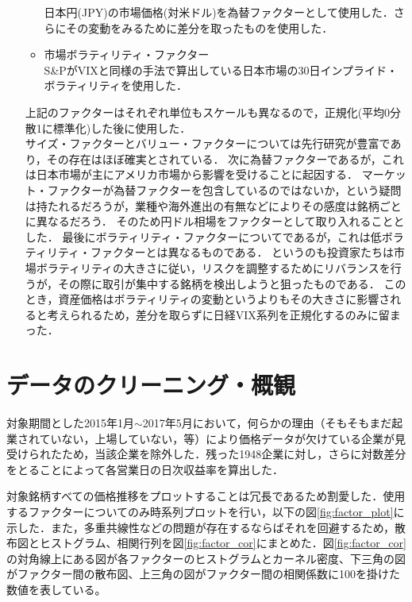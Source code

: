 \documentclass[11pt]{jreport}
\begin{document}
\begin{itemize}
\begin{itemize}
日本円(JPY)の市場価格(対米ドル)を為替ファクターとして使用した．さらにその変動をみるために差分を取ったものを使用した．
\item 市場ボラティリティ・ファクター\\
S\&PがVIXと同様の手法で算出している日本市場の30日インプライド・ボラティリティを使用した．
\end{itemize}
上記のファクターはそれぞれ単位もスケールも異なるので，正規化(平均0分散1に標準化)した後に使用した．\\
\quad 
サイズ・ファクターとバリュー・ファクターについては先行研究が豊富であり，その存在はほぼ確実とされている．
次に為替ファクターであるが，これは日本市場が主にアメリカ市場から影響を受けることに起因する．
マーケット・ファクターが為替ファクターを包含しているのではないか，という疑問は持たれるだろうが，業種や海外進出の有無などによりその感度は銘柄ごとに異なるだろう．
そのため円ドル相場をファクターとして取り入れることとした．
最後にボラティリティ・ファクターについてであるが，これは低ボラティリティ・ファクターとは異なるものである．
というのも投資家たちは市場ボラティリティの大きさに従い，リスクを調整するためにリバランスを行うが，その際に取引が集中する銘柄を検出しようと狙ったものである．
このとき，資産価格はボラティリティの変動というよりもその大きさに影響されると考えられるため，差分を取らずに日経VIX系列を正規化するのみに留まった．\\

\end{itemize}



\section{データのクリーニング・概観}
対象期間とした2015年1月$\sim$2017年5月において，何らかの理由（そもそもまだ起業されていない，上場していない，等）により価格データが欠けている企業が見受けられたため，当該企業を除外した．残った1948企業に対し，さらに対数差分をとることによって各営業日の日次収益率を算出した．

対象銘柄すべての価格推移をプロットすることは冗長であるため割愛した．使用するファクターについてのみ時系列プロットを行い，以下の図\ref{fig:factor_plot}に示した．また，多重共線性などの問題が存在するならばそれを回避するため，散布図とヒストグラム、相関行列を図\ref{fig:factor_cor}にまとめた．図\ref{fig:factor_cor}の対角線上にある図が各ファクターのヒストグラムとカーネル密度、下三角の図がファクター間の散布図、上三角の図がファクター間の相関係数に100を掛けた数値を表している。
\end{document}
